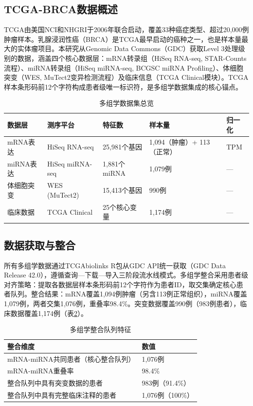 \documentclass[12pt,a4paper]{ctexart}
\begin{document}
\subsection{TCGA-BRCA数据概述}

TCGA由美国NCI和NHGRI于2006年联合启动，覆盖33种癌症类型、超过20,000例肿瘤样本\cite{tcga2012comprehensive}。乳腺浸润性癌（BRCA）是TCGA最早启动的癌种之一，也是样本量最大的实体瘤项目。本研究从Genomic Data Commons（GDC）获取Level 3处理级别的数据，涵盖四个核心数据层：mRNA转录组（HiSeq RNA-seq, STAR-Counts流程）、miRNA转录组（HiSeq miRNA-seq, BCGSC miRNA Profiling）、体细胞突变（WES, MuTect2变异检测流程）及临床信息（TCGA Clinical模块）。TCGA样本条形码前12个字符构成患者级唯一标识符，是多组学数据集成的核心锚点。

\begin{table}[htbp]
\centering
\caption{多组学数据集总览}
\label{tab:data_overview}
\begin{tabular}{lllll}
\toprule
数据层 & 测序平台 & 特征数 & 样本量 & 归一化 \\
\midrule
mRNA表达 & HiSeq RNA-seq & 25,981个基因 & 1,094（肿瘤）+ 113（正常） & TPM \\
miRNA表达 & HiSeq miRNA-seq & 1,881个miRNA & 1,079例 & — \\
体细胞突变 & WES (MuTect2) & 15,413个基因 & 990例 & — \\
临床数据 & TCGA Clinical & 25个核心变量 & 1,174例 & — \\
\bottomrule
\end{tabular}
\end{table}

\subsection{数据获取与整合}

所有多组学数据通过TCGAbiolinks R包\cite{colaprico2016tcgabiolinks}从GDC API统一获取（GDC Data Release 42.0），遵循查询—下载—导入三阶段流水线模式。多组学整合采用患者级对齐策略：提取各数据层样本条形码前12个字符作为患者ID，取交集确定核心患者队列。整合结果：mRNA覆盖1,094例肿瘤（另含113例正常组织），miRNA覆盖1,079例，两者交集1,076例，重叠率98.4\%。突变数据覆盖990例（983例患者），临床数据覆盖1,174例（表\ref{tab:integration}）。

\begin{table}[htbp]
\centering
\caption{多组学整合队列特征}
\label{tab:integration}
\begin{tabular}{ll}
\toprule
整合维度 & 数值 \\
\midrule
mRNA-miRNA共同患者（核心整合队列） & 1,076例 \\
mRNA-miRNA重叠率 & 98.4\% \\
整合队列中具有突变数据的患者 & 983例（91.4\%） \\
整合队列中具有完整临床注释的患者 & 1,076例（100\%） \\
\bottomrule
\end{tabular}
\end{table}
\end{document}
